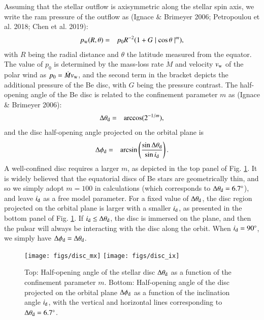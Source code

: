 \documentclass{aa}
\begin{document}
Assuming that the stellar outflow is axisymmetric along the stellar spin axis, we write the ram pressure of the outflow as (Ignace $\&$ Brimeyer 2006; Petropoulou et al. 2018; Chen et al. 2019):
\begin{eqnarray}\label{Pw}
  p_{\rm w}(R,\theta)&=&p_0R^{-2}(1+G\mid\cos\theta\mid^m),
\end{eqnarray}
with $R$ being the radial distance and $\theta$ the latitude measured from the equator. The value of $p_0$ is determined by the mass-loss rate $\dot{M}$ and velocity $v_{\rm w}$ of the polar wind as $p_0=\dot{M}v_{\rm w}$, and the second term in the bracket depicts the additional pressure of the Be disc, with $G$ being the pressure contrast. The half-opening angle of the Be disc is related to the confinement parameter $m$ as (Ignace \& Brimeyer 2006):
\begin{eqnarray}\label{dtheta}
  \Delta\theta_{\rm d}&=&\arccos(2^{-1/m}),
\end{eqnarray}
and the disc half-opening angle projected on the orbital plane is
\begin{eqnarray}\label{dphi}
  \Delta\phi_{\rm d}&=&\arcsin\left(\frac{\sin\Delta\theta_{\rm d}}{\sin{i_{\rm d}}}\right).
\end{eqnarray}
A well-confined disc requires a larger  $m$, as depicted in the top panel of Fig. \ref{fig:disc}. It is widely believed that the equatorial discs of Be stars are geometrically thin, and so we simply adopt $m=100$ in calculations (which corresponds to $\Delta\theta_{\rm d}=6.7^{\circ}$), and leave $i_{\rm d}$ as a free model parameter.
For a fixed value of $\Delta\theta_{\rm d}$, the disc region projected on the orbital plane is larger with a smaller $i_{\rm d}$, as presented in the bottom panel of Fig. \ref{fig:disc}.
If $i_{\rm d}\leq\Delta\theta_{\rm d}$, the disc is immersed on the plane, and then the pulsar will always be interacting with the disc along the orbit. When $i_{\rm d}=90^{\circ}$, we simply have $\Delta\phi_{\rm d}=\Delta\theta_{\rm d}$.

\begin{figure}
  \centering
  \texttt{[image: figs/disc\_mx]}
  \texttt{[image: figs/disc\_ix]}
  \caption{Top: Half-opening angle of the stellar disc $\Delta\theta_{\rm d}$ as a function of the confinement parameter $m$. Bottom: Half-opening angle of the disc projected on the orbital plane $\Delta\phi_{\rm d}$ as a function of the inclination angle $i_{\rm d}$, with the vertical and horizontal lines corresponding to $\Delta\theta_{\rm d}=6.7^{\circ}$.} \label{fig:disc}
\end{figure}
\end{document}
